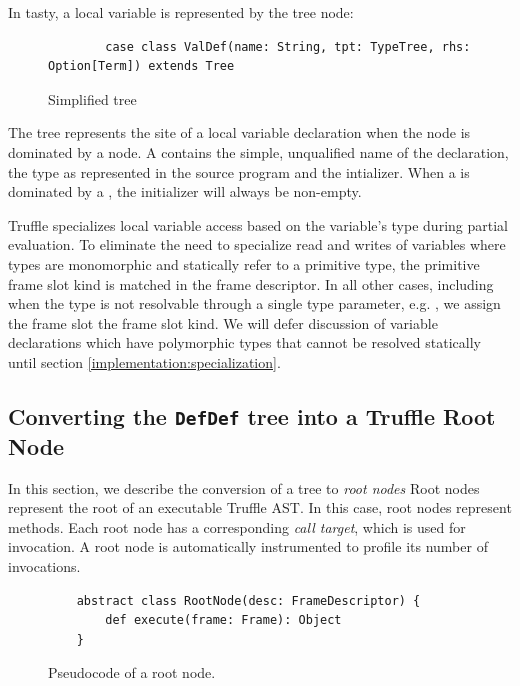 In \acrshort{tasty}, a local variable is represented by the  tree node:

\begin{figure}[H]
	\begin{verbatim}
		case class ValDef(name: String, tpt: TypeTree, rhs: Option[Term]) extends Tree 
	\end{verbatim}
	\caption{Simplified  tree}
\end{figure}

The  tree represents the site of a local variable declaration when the node is dominated by a  node. 
A  contains the simple, unqualified name of the declaration, the type as represented in the source program and the intializer. 
When a  is dominated by a , the initializer will always be non-empty.

Truffle specializes local variable access based on the variable's type during partial evaluation\cite{truffle:partial-eval}. 
To eliminate the need to specialize read and writes of variables where types are monomorphic and statically refer to a primitive type, the primitive frame slot kind is matched in the frame descriptor. 
In all other cases, including when the type is not resolvable through a single type parameter, e.g. , we assign the frame slot the  frame slot kind.
We will defer discussion of variable declarations which have polymorphic types that cannot be resolved statically until section \ref{implementation:specialization}.

\subsection{Converting the \texttt{DefDef} tree into a Truffle Root Node}
\label{impl:subsection:defdef}

In this section, we describe the conversion of a  tree to \textit{root nodes}
Root nodes represent the root of an executable Truffle AST.
In this case, root nodes represent methods.
Each root node has a corresponding \textit{call target}, which is used for invocation.
A root node is automatically instrumented\cite{profiling:atom} to profile its number of invocations. 

\begin{figure}[!htb]
	\begin{verbatim}
	abstract class RootNode(desc: FrameDescriptor) {
		def execute(frame: Frame): Object
	}
	\end{verbatim}
	\caption{Pseudocode of a root node.}
	\label{example:root-node}
\end{figure}

